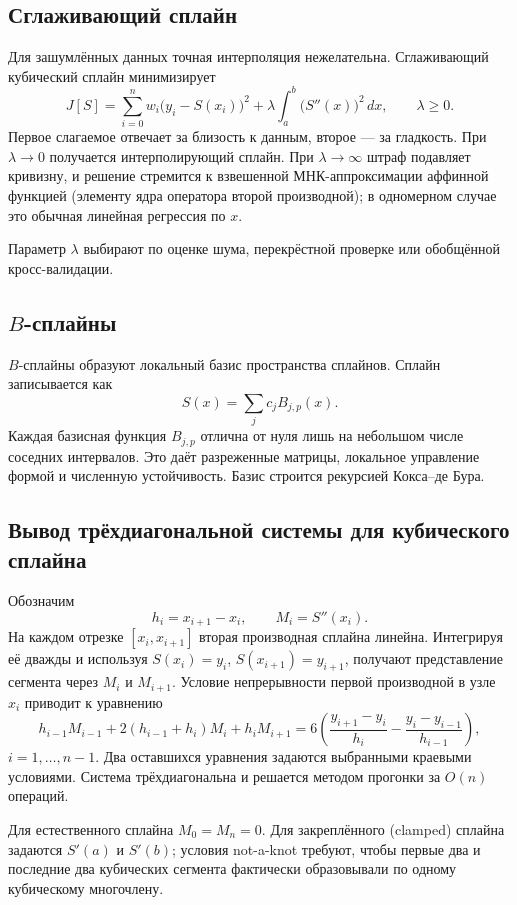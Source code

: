\subsection{Сглаживающий сплайн}

Для зашумлённых данных точная интерполяция нежелательна. Сглаживающий кубический
сплайн минимизирует
\[
    J[S]=
    \sum_{i=0}^{n}w_i\bigl(y_i-S(x_i)\bigr)^2
    +\lambda\int_a^b\bigl(S''(x)\bigr)^2\,dx,
    \qquad \lambda\geq0.
\]
Первое слагаемое отвечает за близость к данным, второе --- за гладкость.
При $\lambda\to0$ получается интерполирующий сплайн. При
$\lambda\to\infty$ штраф подавляет кривизну, и решение стремится к
взвешенной МНК-аппроксимации аффинной функцией (элементу ядра оператора второй
производной); в одномерном случае это обычная линейная регрессия по $x$.

Параметр $\lambda$ выбирают по оценке шума, перекрёстной проверке или обобщённой
кросс-валидации.

\subsection[B-сплайны]{$B$-сплайны}

$B$-сплайны образуют локальный базис пространства сплайнов. Сплайн записывается
как
\[
    S(x)=\sum_j c_jB_{j,p}(x).
\]
Каждая базисная функция $B_{j,p}$ отлична от нуля лишь на небольшом числе
соседних интервалов. Это даёт разреженные матрицы, локальное управление формой и
численную устойчивость. Базис строится рекурсией Кокса--де Бура.

\subsection{Вывод трёхдиагональной системы для кубического сплайна}

Обозначим
\[
    h_i=x_{i+1}-x_i,\qquad M_i=S''(x_i).
\]
На каждом отрезке $[x_i,x_{i+1}]$ вторая производная сплайна линейна. Интегрируя её
дважды и используя $S(x_i)=y_i$, $S(x_{i+1})=y_{i+1}$, получают представление сегмента
через $M_i$ и $M_{i+1}$. Условие непрерывности первой производной в узле $x_i$ приводит к
уравнению
\[
    h_{i-1}M_{i-1}
    +2(h_{i-1}+h_i)M_i
    +h_iM_{i+1}
    =6\left(
       \frac{y_{i+1}-y_i}{h_i}
       -\frac{y_i-y_{i-1}}{h_{i-1}}
      \right),
\]
$ i=1,\ldots,n-1$. Два оставшихся уравнения задаются выбранными краевыми условиями.
Система трёхдиагональна и решается методом прогонки за $O(n)$ операций.

Для естественного сплайна $M_0=M_n=0$. Для закреплённого (clamped) сплайна задаются
$S'(a)$ и $S'(b)$; условия not-a-knot требуют, чтобы первые два и последние два
кубических сегмента фактически образовывали по одному кубическому многочлену.

